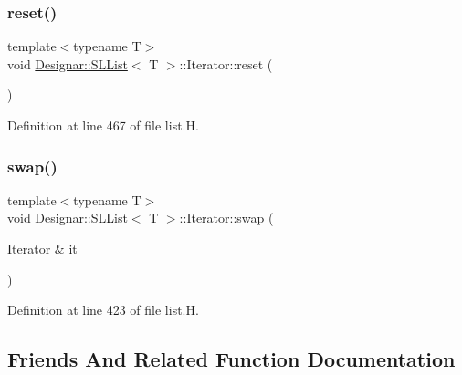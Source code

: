 \subsubsection{\texorpdfstring{reset()}{reset()}}
{\footnotesize\ttfamily template$<$typename T$>$ \\
void \hyperlink{class_designar_1_1_s_l_list}{Designar\+::\+S\+L\+List}$<$ T $>$\+::Iterator\+::reset (\begin{DoxyParamCaption}{ }\end{DoxyParamCaption})\hspace{0.3cm}{\ttfamily [inline]}}



Definition at line 467 of file list.\+H.

\mbox{\label{class_designar_1_1_s_l_list_1_1_iterator_afbb40762fe2a3c8ecea8fb26751492e0}} 
\subsubsection{\texorpdfstring{swap()}{swap()}}
{\footnotesize\ttfamily template$<$typename T$>$ \\
void \hyperlink{class_designar_1_1_s_l_list}{Designar\+::\+S\+L\+List}$<$ T $>$\+::Iterator\+::swap (\begin{DoxyParamCaption}\item[{\hyperlink{class_designar_1_1_s_l_list_1_1_iterator}{Iterator} \&}]{it }\end{DoxyParamCaption})\hspace{0.3cm}{\ttfamily [inline]}}



Definition at line 423 of file list.\+H.



\subsection{Friends And Related Function Documentation}
\mbox{\label{class_designar_1_1_s_l_list_1_1_iterator_ae3421d6be56b523bf3c41ceb29f3e5d7}} 
